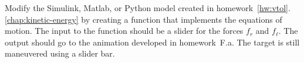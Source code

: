 Modify the Simulink, Matlab, or Python model created in
homework~\ref{hw:vtol}.\ref{chap:kinetic-energy} by creating a function that implements the
equations of motion.  The input to the function should be
a slider for the forces $f_r$ and $f_\ell$.  The output should go to the
animation developed in homework~F.a.  The target is still maneuvered using a slider bar.
